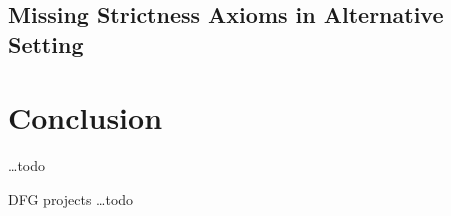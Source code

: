\subsection{Missing Strictness Axioms in Alternative Setting} \label{subsec-freyd-scedrov-2}

\section{Conclusion}
\ldots todo

\begin{acknowledgements}
DFG projects \ldots todo
\end{acknowledgements}





